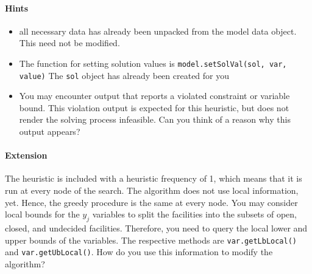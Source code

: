 \documentclass[a4paper,10pt]{article}
\begin{document}
\paragraph{Hints}

\begin{itemize}
 \item all necessary data has already been unpacked from the
 model data object. This need not be modified.
 \item The function for setting solution values
 is \texttt{model.setSolVal(sol, var, value)}
 The \texttt{sol} object has already been created for you
 \item You may encounter output that
 reports a violated constraint or variable bound. This
 violation output is expected for this heuristic, but
 does not render the solving process infeasible.
 Can you think of a reason why this output appears?
\end{itemize}

\paragraph{Extension}

 The heuristic is included with a heuristic frequency
 of 1, which means that it is run at every node of the search. The algorithm
 does not use local information, yet. Hence, the greedy procedure
 is the same at every node.
 You may consider local bounds for the $y_{j}$
 variables to split the facilities into the subsets
 of open, closed, and undecided facilities. Therefore,
 you need to query the local lower and upper bounds of
 the variables. The respective methods are
 \texttt{var.getLbLocal()} and \texttt{var.getUbLocal()}.
 How do you use this information to modify the algorithm?
\end{document}
